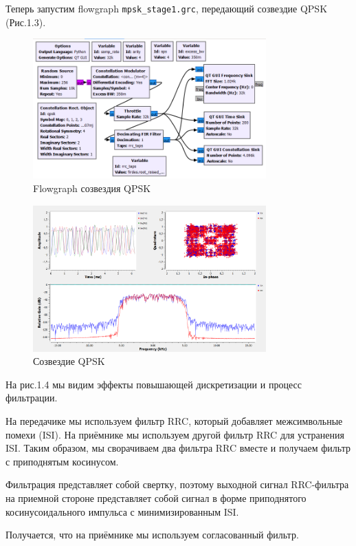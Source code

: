 \documentclass[a4paper,12pt]{report}
\begin{document}
    Теперь запустим flowgraph \texttt{mpsk\_stage1.grc}, передающий созвездие QPSK (Рис.1.3).
\begin{figure}[H]
        \centering
        \includegraphics[width=0.8\textwidth]{fig1-3.PNG}
        \caption{Flowgraph созвездия QPSK}
        \label{fig:fig1-3}
\end{figure}
\begin{figure}[H]
        \centering
        \includegraphics[width=0.8\textwidth]{fig1-4.PNG}
        \caption{Созвездие QPSK}
        \label{fig:fig1-4}
\end{figure}

    На рис.1.4 мы видим эффекты повышающей дискретизации и процесс фильтрации. 
    
    На передачике мы используем фильтр RRC, который добавляет межсимвольные помехи (ISI). На приёмнике мы используем другой фильтр RRC  для устранения ISI. Таким образом, мы сворачиваем два фильтра RRC вместе и получаем фильтр с приподнятым косинусом. 
    
    Фильтрация представляет собой свертку, поэтому выходной сигнал RRC-фильтра на приемной стороне представляет собой сигнал в форме приподнятого косинусоидального импульса с минимизированным ISI. 
    
     Получается, что на приёмнике мы используем согласованный фильтр. 
     
\end{document}
